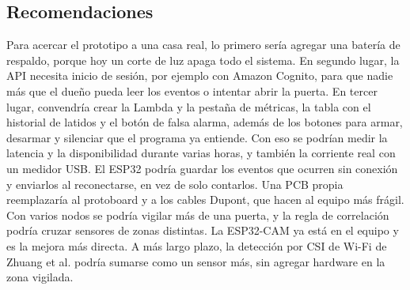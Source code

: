 \documentclass[manuscript,screen,nonacm]{acmart}
\begin{document}
\subsection{Recomendaciones}
Para acercar el prototipo a una casa real, lo primero sería agregar una batería de respaldo, porque hoy un corte de luz apaga todo el sistema. En segundo lugar, la API necesita inicio de sesión, por ejemplo con Amazon Cognito, para que nadie más que el dueño pueda leer los eventos o intentar abrir la puerta. En tercer lugar, convendría crear la Lambda y la pestaña de métricas, la tabla con el historial de latidos y el botón de falsa alarma, además de los botones para armar, desarmar y silenciar que el programa ya entiende. Con eso se podrían medir la latencia y la disponibilidad durante varias horas, y también la corriente real con un medidor USB. El ESP32 podría guardar los eventos que ocurren sin conexión y enviarlos al reconectarse, en vez de solo contarlos. Una PCB propia reemplazaría al protoboard y a los cables Dupont, que hacen al equipo más frágil. Con varios nodos se podría vigilar más de una puerta, y la regla de correlación podría cruzar sensores de zonas distintas. La ESP32-CAM ya está en el equipo y es la mejora más directa. A más largo plazo, la detección por CSI de Wi-Fi de Zhuang et al. \cite{zhuang2021intrusion} podría sumarse como un sensor más, sin agregar hardware en la zona vigilada.
\end{document}
